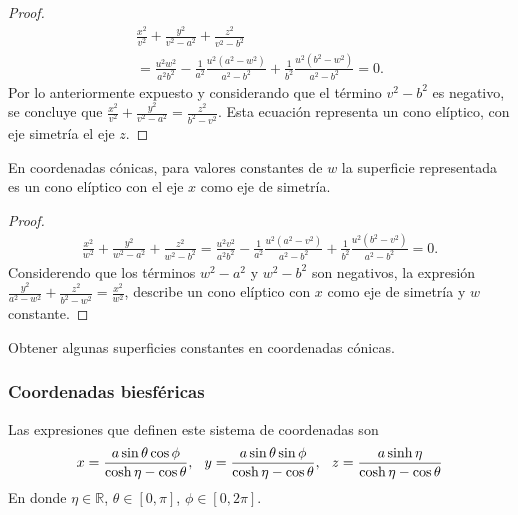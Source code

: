 \begin{proof}
\begin{multline*}
\frac{x^2}{v^2}+\frac{y^2}{v^2-a^2}+\frac{z^2}{v^2-b^2} \\
= \frac{u^2w^2}{a^2b^2}-\frac{1}{a^2}\frac{u^2\left( a^2-w^2\right) }{a^2-b^2}+\frac{1}{b^2}\frac{u^2\left( b^2-w^2\right) }{a^2-b^2} =0.
\end{multline*}
Por lo anteriormente expuesto y considerando que el término $ v^2-b^2$ es negativo,
se concluye que  $\frac{x^2}{v^2}+\frac{y^2}{v^2-a^2}=\frac{z^2}{b^2-v^2}$.
Esta ecuación representa un cono elíptico, con eje simetría el eje $z$.
\end{proof}

\begin{prop}
En coordenadas cónicas, para valores constantes de $w$ la superficie
representada es un cono elíptico con el eje $x$
como eje de simetría.
\end{prop}

\begin{proof}
\begin{multline*}
\frac{x^2}{w^2}+\frac{y^2}{w^2-a^2}+\frac{z^2}{w^2-b^2}
= \frac{u^2v^2}{a^2b^2}-\frac{1}{a^2}\frac{u^2\left( a^2-v^2\right)}{a^2-b^2}
+\frac{1}{b^2}\frac{u^2\left(b^2-v^2\right) }{a^2-b^2} = 0.
\end{multline*}
Considerendo que los términos $w^2-a^2$ y $w^2-b^2$ son negativos, la expresión
$\frac{y^2}{a^2-w^2}+\frac{z^2}{b^2-w^2}=\frac{x^2}{w^2}$,
describe un cono elíptico con $x$ como eje de simetría y $w$ constante.

\end{proof}
\begin{ejer}
Obtener algunas superficies constantes en coordenadas cónicas.
\end{ejer}

\subsubsection{Coordenadas biesféricas} 

Las expresiones que definen este sistema de coordenadas son
\begin{equation}
x = \frac{a\sin \theta \cos \phi }{\cosh \eta -\cos \theta} ,\hskip0.25cm y = \frac{a\sin \theta \sin \phi }{\cosh \eta -\cos \theta }, \hskip0.25cm z=\frac{a\sinh \eta }{\cosh \eta -\cos \theta}
\end{equation}
En donde $\eta \in \mathbb{R}$, $\theta \in [0,\pi] $, $\phi \in [0,2\pi] $.

